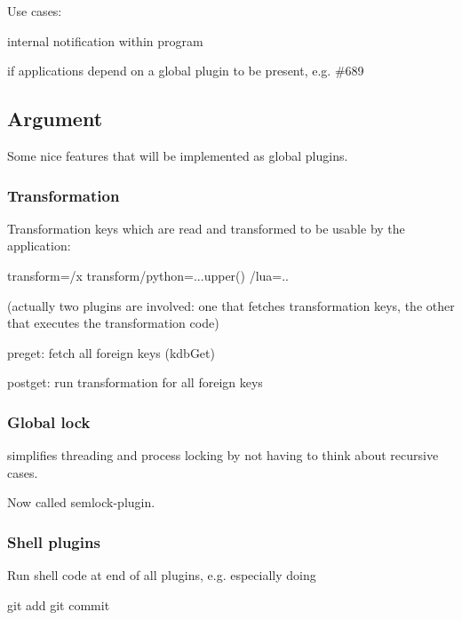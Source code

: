 Use cases\+:


\begin{DoxyItemize}
\item internal notification within program
\item if applications depend on a global plugin to be present, e.\+g. \#689
\end{DoxyItemize}

\subsection*{Argument}

Some nice features that will be implemented as global plugins.

\subsubsection*{Transformation}

Transformation keys which are read and transformed to be usable by the application\+: \begin{DoxyVerb}[dir/a]
transform=/x
transform/python=...upper()
         /lua=..
\end{DoxyVerb}


(actually two plugins are involved\+: one that fetches transformation keys, the other that executes the transformation code)


\begin{DoxyItemize}
\item preget\+: fetch all foreign keys (kdb\+Get)
\item postget\+: run transformation for all foreign keys
\end{DoxyItemize}

\subsubsection*{Global lock}

simplifies threading and process locking by not having to think about recursive cases.

Now called {\ttfamily semlock}-\/plugin.

\subsubsection*{Shell plugins}

Run shell code at end of all plugins, e.\+g. especially doing \begin{DoxyVerb}git add
git commit
\end{DoxyVerb}


